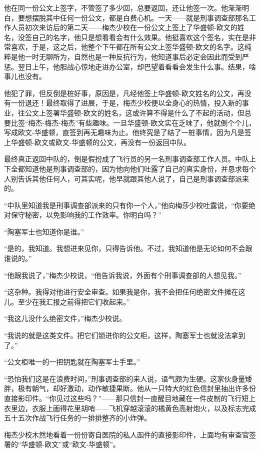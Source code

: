     他在同一份公文上签字，不管签了多少回，总要返回，还让他签一次。他渐渐明白，要想摆脱其中任何一份公文，都是白费心机。一天——就是刑事调查部那名工作人员初次来访后的第二天——梅杰少校在一份公文上签上了华盛顿-欧文的姓名，没签自己的名字，他只是想看看会有什么效果。他挺喜欢这个签名，实在是非常喜欢，于是，这之后，他整个下午都在所有公文上签华盛顿-欧文的名字。这纯粹是他一时无聊所为，自然也是一种反抗行为，他知道事后必定会因此而受到严惩。翌日上午，他胆战心惊地走进办公室，却巴望着看看会发生什么事。结果，啥事儿也没有。

    他犯了罪，但反倒是桩好事，原因是，凡经他签上华盛顿-欧文姓名的公文，再没有一份退还！最终取得了进展，于是，梅杰少校便以全身心的热情，投入新的事业，往公文上签署华盛顿-欧文的姓名，这或许算不得是什么了不起的活动，但总要比签“梅杰-梅杰-梅杰”有些趣味。一旦华盛顿-欧文实在乏味了，他就倒个个儿，写成欧文-华盛顿，直签到再无趣味为止。他终究是了结了一桩事情，因为凡是签上华盛顿-欧文或欧文-华盛顿的公文，再没有一份返回中队。

    最终真正返回中队的，倒是假扮成了飞行员的另一名刑事调查部工作人员。中队上下全都知道他是刑事调查部的，因为他向他们吐露了自己的真实身份，并恳求每个人别告诉其他任何人，可其实呢，他早就跟其他人说了，自己是刑事调查部派来的。

    “中队里知道我是刑事调查部派来的只有你一个人，”他向梅莎少校吐露说，“你要绝对保守秘密，以免影响我的工作效率。你明白吗？”

    “陶塞军士也知道你是谁。”

    “是的，我知道。我想进来见你，只得告诉他。不过，我知道他是无论如何不会跟谁说的。”

    “他跟我说了，”梅杰少校说，“他告诉我说，外面有个刑事调查部的人想见我。”

    “这杂种。我得对他进行安全审查。如果我是你，我不会把任何绝密文件摊在这儿。至少在我汇报之前得把它们收起来。”

    “我这儿没什么绝密文件，”梅杰少校说。

    “我说的就是这类文件。把它们锁进你的公文柜，这样，陶塞军士也就没法拿到了。”

    “公文柜唯一的一把钥匙就在陶塞军士手里。”

    “恐怕我们这是在浪费时间，”刑事调查部的来人说，语气颇为生硬。这家伙身量矮胖，极有朝气，却好激动，动作敏捷果断。他从一只特大的红色信封里抽出许多份直接影印件。“你见过这些吗？”——那只信封一直醒目地藏在一件皮制的飞行短上衣里边，衣服上画得花里胡哨——飞机穿越滚滚的橘黄色高射炮火，以及标志完成五十五次作战飞行任务的一排排整齐的小炸弹。

    梅杰少校木然地看着一份份寄自医院的私人函件的直接影印件，上面均有审查官签署的“华盛顿-欧文”或“欧文-华盛顿”。

